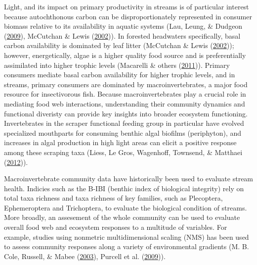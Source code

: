\documentclass[double,12pt]{beavtex}
\begin{document}
  Light, and its impact on primary productivity in streams is of
  particular interest because autochthonous carbon can be
  disproportionately represented in consumer biomass relative to its
  availability in aquatic systems (Lau, Leung, \& Dudgeon
  (\protect\hyperlink{ref-Lau2009}{2009}), McCutchan \& Lewis
  (\protect\hyperlink{ref-McCutchan2002}{2002})). In forested headwaters
  specifically, basal carbon availability is dominated by leaf litter
  (McCutchan \& Lewis (\protect\hyperlink{ref-McCutchan2002}{2002}));
  however, energetically, algae is a higher quality food source and is
  preferentially assimilated into higher trophic levels (Macarelli \&
  others (\protect\hyperlink{ref-Macarelli2011}{2011})). Primary consumers
  mediate basal carbon availability for higher trophic levels, and in
  streams, primary consumers are dominated by macroinvertebrates, a major
  food resource for insectivorous fish. Because macroinvertebrates play a
  crucial role in mediating food web interactions, understanding their
  community dynamics and functional diveristy can provide key insights
  into broader ecosystem functioning. Invertebrates in the scraper
  functional feeding group in particular have evolved specialized
  mouthparts for consuming benthic algal biofilms (periphyton), and
  increases in algal production in high light areas can elicit a positive
  response among these scraping taxa (Liess, Le Gros, Wagenhoff, Townsend,
  \& Matthaei (\protect\hyperlink{ref-liess2012}{2012})).
  
  Macroinvertebrate community data have historically been used to evaluate
  stream health. Indicies such as the B-IBI (benthic index of biological
  integrity) rely on total taxa richness and taxa richness of key
  families, such as Plecoptera, Ephemeroptera and Trichoptera, to evaluate
  the biological condition of streams. More broadly, an assesement of the
  whole community can be used to evaluate overall food web and ecosystem
  responses to a multitude of variables. For example, studies using
  nonmetric multidimensional scaling (NMS) has been used to assess
  community responses along a variety of environmental gradients (M. B.
  Cole, Russell, \& Mabee (\protect\hyperlink{ref-Cole2003}{2003}),
  Purcell et al. (\protect\hyperlink{ref-Purcell2009}{2009})).
  
\end{document}
